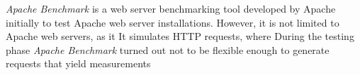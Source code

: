 \emph{Apache Benchmark} is a web server benchmarking tool developed by Apache initially to test Apache web server installations. However, it is not limited to Apache web servers, as it  It simulates HTTP requests, where 
During the testing phase \emph{Apache Benchmark} turned out not to be flexible enough to generate requests that yield measurements
